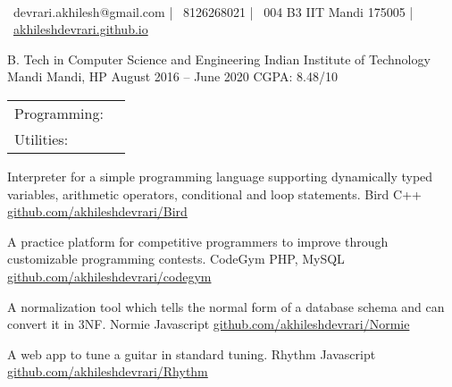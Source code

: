\documentclass[]{awesome-cv}
\begin{document}
    
\begin{center}
	  \\
	\vspace{2mm}
	{\faEnvelope\ devrari.akhilesh@gmail.com} | {\faMobile\ 8126268021} | {\faMapMarker\ 004 B3 IIT Mandi 175005} | {\faLink\ \href{https://akhileshdevrari.github.io/}{akhileshdevrari.github.io}}
\end{center}
\begin{cventries}
	\cventry
	{B. Tech in Computer Science and Engineering}
	{Indian Institute of Technology Mandi}
	{Mandi, HP}
	{August 2016 – June 2020}
	{CGPA: 8.48/10}
\end{cventries}


\begin{cventries}
	\vspace{-4mm}
	\cventry
	{}
	{\def\arraystretch{1.15}{\begin{tabular}{ l l }
		Programming:  & {\skill{ Comfortable: C/C++, Javascript \hspace{1cm} Less experience: PHP, Python}} \\
		Utilities:  & {\skill{ MySQL, Git, Linux shell utilities}} \\
		\end{tabular}}}
	{}
	{}
	{}
\end{cventries}

\vspace{-7mm}
\begin{cventries}
	\cventry
	{Interpreter for a simple programming language supporting dynamically typed variables, arithmetic operators, conditional and loop statements.}
	{Bird}
	{C++}
	{\href{https://github.com/akhileshdevrari/Bird}{github.com/akhileshdevrari/Bird}}
	{}
	
	\vspace{-5mm}
	\cventry
	{A practice platform for competitive programmers to improve through customizable programming contests.}
	{CodeGym}
	{PHP, MySQL}
	{\href{https://github.com/akhileshdevrari/codegym}{github.com/akhileshdevrari/codegym}}
	{}
	
	
	\vspace{-5mm}
	\cventry
	{A normalization tool which tells the normal form of a database schema and can convert it in 3NF.}
	{Normie}
	{Javascript}
	{\href{https://github.com/akhileshdevrari/Normie}{github.com/akhileshdevrari/Normie}}
	{}
	
	\vspace{-5mm}
	\cventry
	{A web app to tune a guitar in standard tuning.}
	{Rhythm}
	{Javascript}
	{\href{https://github.com/akhileshdevrari/Rhythm}{github.com/akhileshdevrari/Rhythm}}
	{}
	
\end{cventries}
\end{document}
